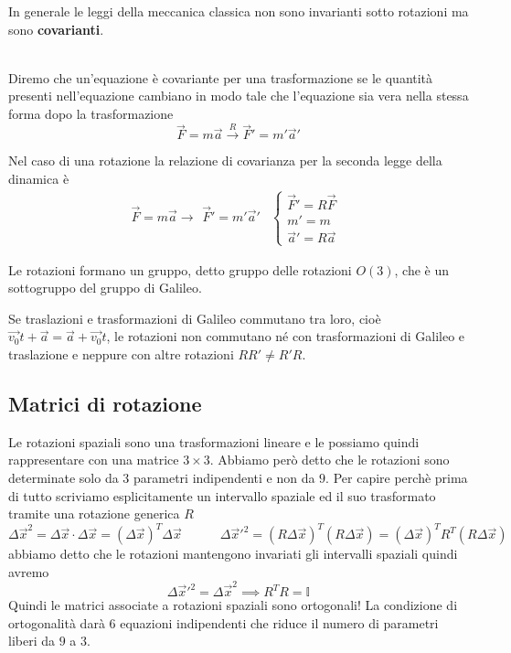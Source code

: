 \documentclass[12pt,a4paper,titlepage, twoside, openright]{book}
\newenvironment{definizione}[1][\empty]{\begin{Definizione}{
\ifx\empty#1\relax\else\mdseries\itshape#1\\\fi
}{}}{\end{Definizione}}
\numberwithin{equation}{chapter}
\begin{document}
In generale le leggi della meccanica classica non sono invarianti sotto rotazioni ma sono \textbf{covarianti}. 
\begin{definizione}
Diremo che un'equazione è covariante per una trasformazione se le quantità presenti nell'equazione cambiano in modo tale che l'equazione sia vera nella stessa forma dopo la trasformazione
\[
\vec{F} = m\vec{a} \overset{R}{\longrightarrow} \vec{F}' = m'\vec{a}'
\]
\end{definizione}

Nel caso di una rotazione la relazione di covarianza per la seconda legge della dinamica è 
\[
\vec{F}=m\vec{a} \longrightarrow \begin{array}{cc} \vec{F}'=m'\vec{a}' & \begin{cases} \vec{F}' = R\vec{F} \\ m'=m \\ \vec{a}'=R\vec{a} \end{cases} \end{array}
\]

Le rotazioni formano un gruppo, detto gruppo delle rotazioni $O(3)$, che è un sottogruppo del gruppo di Galileo. 

Se traslazioni e trasformazioni di Galileo commutano tra loro, cioè $\vec{v_0}t+\vec{a}=\vec{a}+\vec{v_0}t$, le rotazioni non commutano né con trasformazioni di Galileo e traslazione e neppure con altre rotazioni $RR'\neq R'R$.

\subsection{Matrici di rotazione}
Le rotazioni spaziali sono una trasformazioni lineare e le possiamo quindi rappresentare con una matrice $3\times 3$. Abbiamo però detto che le rotazioni sono determinate solo da $3$ parametri indipendenti e non da $9$.
Per capire perchè prima di tutto scriviamo esplicitamente un intervallo spaziale ed il suo trasformato tramite una rotazione generica $R$
\[
\Delta \vec{x}^2=\Delta \vec{x} \cdot \Delta \vec{x} = (\Delta \vec{x})^T \Delta \vec{x} \qquad\quad  \Delta \vec{x}'^2 = (R \Delta \vec{x})^T (R\Delta \vec{x})=(\Delta \vec{x})^T R^T (R\Delta \vec{x})
\]
abbiamo detto che le rotazioni mantengono invariati gli intervalli spaziali quindi avremo
\[
\Delta \vec{x}'^2=\Delta \vec{x}^2 \implies R^T  R = \mathbb{I}
\]
Quindi le matrici associate a rotazioni spaziali sono ortogonali!
La condizione di ortogonalità darà $6$ equazioni indipendenti che riduce il numero di parametri liberi da $9$ a $3$.
\end{document}
